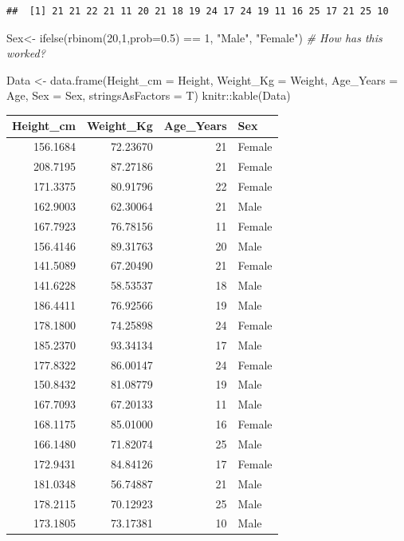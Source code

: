 \documentclass[
]{book}
\newenvironment{Shaded}{\begin{snugshade}}{\end{snugshade}}
\newcommand{\AttributeTok}[1]{\textcolor[rgb]{0.77,0.63,0.00}{#1}}
\newcommand{\CommentTok}[1]{\textcolor[rgb]{0.56,0.35,0.01}{\textit{#1}}}
\newcommand{\DecValTok}[1]{\textcolor[rgb]{0.00,0.00,0.81}{#1}}
\newcommand{\FloatTok}[1]{\textcolor[rgb]{0.00,0.00,0.81}{#1}}
\newcommand{\FunctionTok}[1]{\textcolor[rgb]{0.00,0.00,0.00}{#1}}
\newcommand{\NormalTok}[1]{#1}
\newcommand{\OtherTok}[1]{\textcolor[rgb]{0.56,0.35,0.01}{#1}}
\newcommand{\SpecialCharTok}[1]{\textcolor[rgb]{0.00,0.00,0.00}{#1}}
\newcommand{\StringTok}[1]{\textcolor[rgb]{0.31,0.60,0.02}{#1}}
\theoremstyle{definition}
\theoremstyle{definition}
\theoremstyle{definition}
\theoremstyle{definition}
\theoremstyle{remark}
\begin{document}
\begin{verbatim}
##  [1] 21 21 22 21 11 20 21 18 19 24 17 24 19 11 16 25 17 21 25 10
\end{verbatim}

\begin{Shaded}
\begin{Highlighting}[]
\NormalTok{Sex}\OtherTok{\textless{}{-}} \FunctionTok{ifelse}\NormalTok{(}\FunctionTok{rbinom}\NormalTok{(}\DecValTok{20}\NormalTok{,}\DecValTok{1}\NormalTok{,}\AttributeTok{prob=}\FloatTok{0.5}\NormalTok{) }\SpecialCharTok{==} \DecValTok{1}\NormalTok{, }\StringTok{"Male"}\NormalTok{, }\StringTok{"Female"}\NormalTok{) }\CommentTok{\# How has this worked?}

\NormalTok{Data }\OtherTok{\textless{}{-}} \FunctionTok{data.frame}\NormalTok{(}\AttributeTok{Height\_cm =}\NormalTok{ Height, }\AttributeTok{Weight\_Kg =}\NormalTok{ Weight, }\AttributeTok{Age\_Years =}\NormalTok{ Age, }\AttributeTok{Sex =}\NormalTok{ Sex, }\AttributeTok{stringsAsFactors =}\NormalTok{ T)}
\NormalTok{knitr}\SpecialCharTok{::}\FunctionTok{kable}\NormalTok{(Data)}
\end{Highlighting}
\end{Shaded}

\begin{tabular}{r|r|r|l}
\hline
Height\_cm & Weight\_Kg & Age\_Years & Sex\\
\hline
156.1684 & 72.23670 & 21 & Female\\
\hline
208.7195 & 87.27186 & 21 & Female\\
\hline
171.3375 & 80.91796 & 22 & Female\\
\hline
162.9003 & 62.30064 & 21 & Male\\
\hline
167.7923 & 76.78156 & 11 & Female\\
\hline
156.4146 & 89.31763 & 20 & Male\\
\hline
141.5089 & 67.20490 & 21 & Female\\
\hline
141.6228 & 58.53537 & 18 & Male\\
\hline
186.4411 & 76.92566 & 19 & Male\\
\hline
178.1800 & 74.25898 & 24 & Female\\
\hline
185.2370 & 93.34134 & 17 & Male\\
\hline
177.8322 & 86.00147 & 24 & Female\\
\hline
150.8432 & 81.08779 & 19 & Male\\
\hline
167.7093 & 67.20133 & 11 & Male\\
\hline
168.1175 & 85.01000 & 16 & Female\\
\hline
166.1480 & 71.82074 & 25 & Male\\
\hline
172.9431 & 84.84126 & 17 & Female\\
\hline
181.0348 & 56.74887 & 21 & Male\\
\hline
178.2115 & 70.12923 & 25 & Male\\
\hline
173.1805 & 73.17381 & 10 & Male\\
\hline
\end{tabular}
\end{document}
